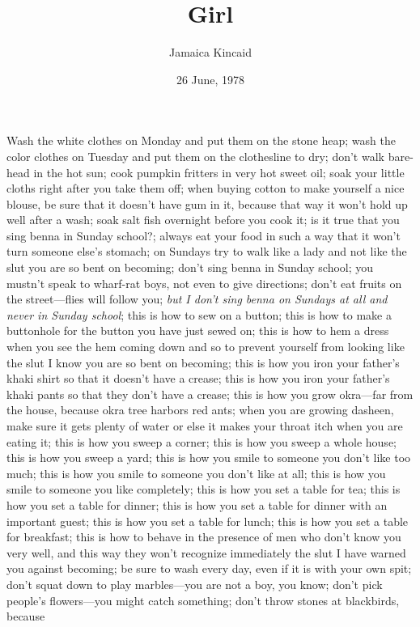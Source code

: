 \documentclass{article}
\title{Girl}
\author{Jamaica Kincaid}
\date{26 June, 1978}
\begin{document}
\maketitle

Wash the white clothes on Monday and put them on the stone heap; wash the color
clothes on Tuesday and put them on the clothesline to dry; don’t walk bare-head
in the hot sun; cook pumpkin fritters in very hot sweet oil; soak your little
cloths right after you take them off; when buying cotton to make yourself a
nice blouse, be sure that it doesn’t have gum in it, because that way it won’t
hold up well after a wash; soak salt fish overnight before you cook it; is it
true that you sing benna in Sunday school?; always eat your food in such a way
that it won’t turn someone else’s stomach; on Sundays try to walk like a lady
and not like the slut you are so bent on becoming; don’t sing benna in Sunday
school; you mustn’t speak to wharf-rat boys, not even to give directions; don’t
eat fruits on the street---flies will follow you; \emph{but I don’t sing benna
on Sundays at all and never in Sunday school}; this is how to sew on a button;
this is how to make a buttonhole for the button you have just sewed on; this is
how to hem a dress when you see the hem coming down and so to prevent yourself
from looking like the slut I know you are so bent on becoming; this is how you
iron your father’s khaki shirt so that it doesn’t have a crease; this is how
you iron your father’s khaki pants so that they don’t have a crease; this is
how you grow okra---far from the house, because okra tree harbors red ants;
when you are growing dasheen, make sure it gets plenty of water or else it
makes your throat itch when you are eating it; this is how you sweep a corner;
this is how you sweep a whole house; this is how you sweep a yard; this is how
you smile to someone you don’t like too much; this is how you smile to someone
you don’t like at all; this is how you smile to someone you like completely;
this is how you set a table for tea; this is how you set a table for dinner;
this is how you set a table for dinner with an important guest; this is how you
set a table for lunch; this is how you set a table for breakfast; this is how
to behave in the presence of men who don’t know you very well, and this way
they won’t recognize immediately the slut I have warned you against becoming;
be sure to wash every day, even if it is with your own spit; don’t squat down
to play marbles---you are not a boy, you know; don’t pick people’s
flowers---you might catch something; don’t throw stones at blackbirds, because
\end{document}
